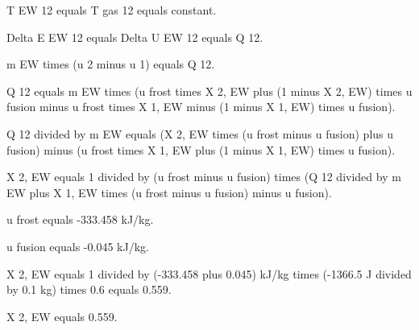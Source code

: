 T EW 12 equals T gas 12 equals constant.  

Delta E EW 12 equals Delta U EW 12 equals Q 12.  

m EW times (u 2 minus u 1) equals Q 12.  

Q 12 equals m EW times (u frost times X 2, EW plus (1 minus X 2, EW) times u fusion minus u frost times X 1, EW minus (1 minus X 1, EW) times u fusion).  

Q 12 divided by m EW equals (X 2, EW times (u frost minus u fusion) plus u fusion) minus (u frost times X 1, EW plus (1 minus X 1, EW) times u fusion).  

X 2, EW equals 1 divided by (u frost minus u fusion) times (Q 12 divided by m EW plus X 1, EW times (u frost minus u fusion) minus u fusion).  

u frost equals -333.458 kJ/kg.  

u fusion equals -0.045 kJ/kg.  

X 2, EW equals 1 divided by (-333.458 plus 0.045) kJ/kg times (-1366.5 J divided by 0.1 kg) times 0.6 equals 0.559.  

X 2, EW equals 0.559.